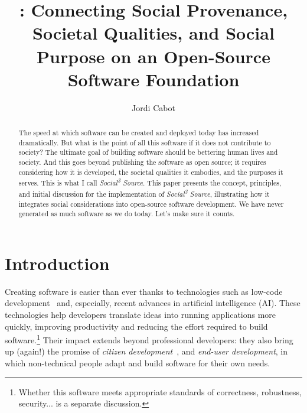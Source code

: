 \documentclass[11pt,a4paper]{article}
\title{\socialsource{}: Connecting Social Provenance,
Societal Qualities, and Social Purpose on an Open-Source Software Foundation}
\author{Jordi Cabot}
\affiliation{%
\institution{Luxembourg Institute of Science and Technology}
\institution{University of Luxembourg}
\city{Esch-sur-Alzette}
\country{Luxembourg}}
\date{}
\newcommand{\socialsource}{\texorpdfstring{\textit{Social\textsuperscript{3} Source}}{Social3 Source}}
\begin{document}
\maketitle
\begin{abstract}
The speed at which software can be created and deployed today has increased dramatically.
But what is the point of all this software if it does not contribute to society?
The ultimate goal of building software should be bettering human lives and society.
And this goes beyond publishing the software as open source; it requires considering how it is developed, the societal qualities it embodies, and the purposes it serves.
This is what I call \socialsource{}.
This paper presents the concept, principles, and initial discussion for the implementation of \socialsource{}, illustrating how it integrates social considerations into open-source software development.
We have never generated as much software as we do today.
Let's make sure it counts.

\end{abstract}


\section{Introduction}

Creating software is easier than ever thanks to technologies such as low-code development~\cite{Cabot2024LowCode} and, especially, recent advances in artificial intelligence (AI).
These technologies help developers translate ideas into running applications more quickly, improving productivity and reducing the effort required to build software.\footnote{Whether this software meets appropriate standards of correctness, robustness, security... is a separate discussion.}
Their impact extends beyond professional developers: they also bring up (again!) the promise of \emph{citizen development}~\cite{Binzer2022Citizen}, and \emph{end-user development}\cite{Fischer2004MetaDesign}, in which non-technical people adapt and build software for their own needs.

\end{document}
